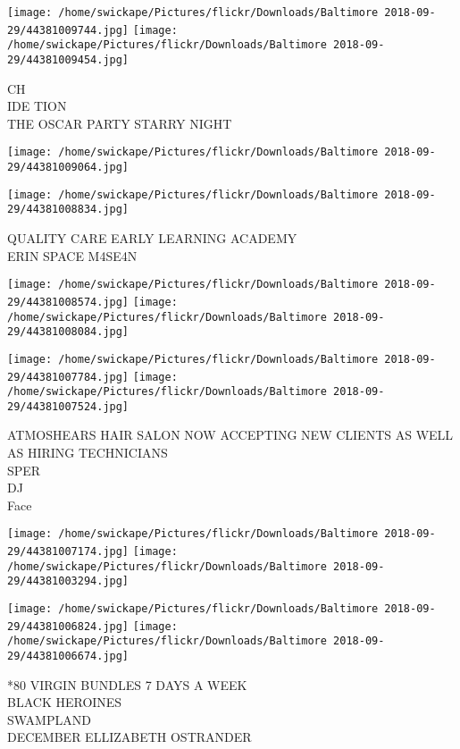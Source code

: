 \documentclass[10pt,letterpaper]{article}
\begin{document}
\vspace{0.25in}
\texttt{[image: /home/swickape/Pictures/flickr/Downloads/Baltimore 2018-09-29/44381009744.jpg]}
\texttt{[image: /home/swickape/Pictures/flickr/Downloads/Baltimore 2018-09-29/44381009454.jpg]}

CH\\
IDE TION\\
THE OSCAR PARTY STARRY NIGHT\\
\pagebreak

\texttt{[image: /home/swickape/Pictures/flickr/Downloads/Baltimore 2018-09-29/44381009064.jpg]}

\vspace{0.25in}
\texttt{[image: /home/swickape/Pictures/flickr/Downloads/Baltimore 2018-09-29/44381008834.jpg]}

QUALITY CARE EARLY LEARNING ACADEMY\\
ERIN SPACE M4SE4N\\
\pagebreak

\texttt{[image: /home/swickape/Pictures/flickr/Downloads/Baltimore 2018-09-29/44381008574.jpg]}
\texttt{[image: /home/swickape/Pictures/flickr/Downloads/Baltimore 2018-09-29/44381008084.jpg]}

\texttt{[image: /home/swickape/Pictures/flickr/Downloads/Baltimore 2018-09-29/44381007784.jpg]}
\texttt{[image: /home/swickape/Pictures/flickr/Downloads/Baltimore 2018-09-29/44381007524.jpg]}

ATMOSHEARS HAIR SALON NOW ACCEPTING NEW CLIENTS AS WELL AS HIRING TECHNICIANS\\
SPER\\
DJ\\
Face\\
\pagebreak

\texttt{[image: /home/swickape/Pictures/flickr/Downloads/Baltimore 2018-09-29/44381007174.jpg]}
\texttt{[image: /home/swickape/Pictures/flickr/Downloads/Baltimore 2018-09-29/44381003294.jpg]}

\texttt{[image: /home/swickape/Pictures/flickr/Downloads/Baltimore 2018-09-29/44381006824.jpg]}
\texttt{[image: /home/swickape/Pictures/flickr/Downloads/Baltimore 2018-09-29/44381006674.jpg]}

*80 VIRGIN BUNDLES 7 DAYS A WEEK\\
BLACK HEROINES\\
SWAMPLAND\\
DECEMBER ELLIZABETH OSTRANDER\\
\pagebreak
\end{document}
